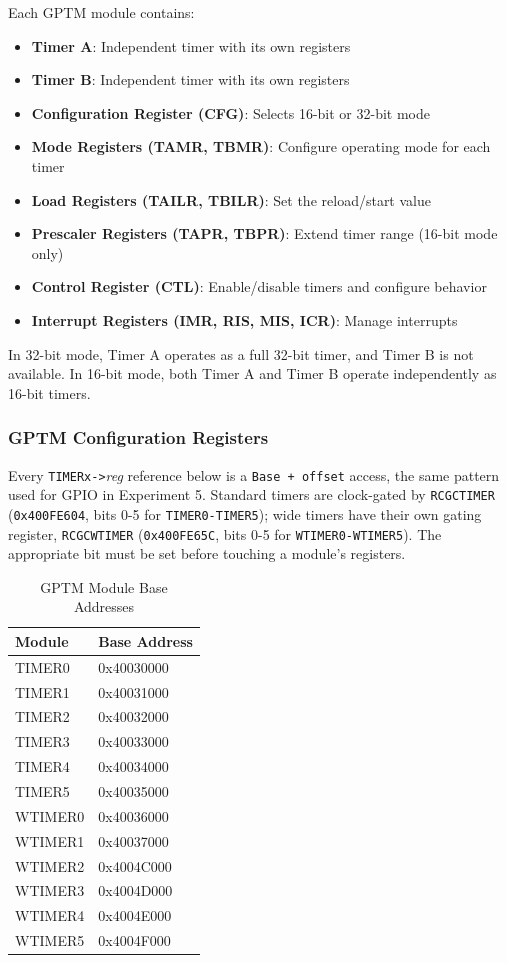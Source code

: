 Each GPTM module contains:
\begin{itemize}[nosep]
  \item \textbf{Timer A}: Independent timer with its own registers
  \item \textbf{Timer B}: Independent timer with its own registers
  \item \textbf{Configuration Register (CFG)}: Selects 16-bit or 32-bit mode
  \item \textbf{Mode Registers (TAMR, TBMR)}: Configure operating mode for each timer
  \item \textbf{Load Registers (TAILR, TBILR)}: Set the reload/start value
  \item \textbf{Prescaler Registers (TAPR, TBPR)}: Extend timer range (16-bit mode only)
  \item \textbf{Control Register (CTL)}: Enable/disable timers and configure behavior
  \item \textbf{Interrupt Registers (IMR, RIS, MIS, ICR)}: Manage interrupts
\end{itemize}

\noindent
In 32-bit mode, Timer A operates as a full 32-bit timer, and Timer B is not available. In 16-bit mode, both Timer A and Timer B operate independently as 16-bit timers.

\subsubsection{GPTM Configuration Registers}

Every \texttt{TIMERx->}\emph{reg} reference below is a \texttt{Base + offset} access, the same pattern used for GPIO in Experiment 5. Standard timers are clock-gated by \texttt{RCGCTIMER} (\texttt{0x400FE604}, bits 0-5 for \texttt{TIMER0-TIMER5}); wide timers have their own gating register, \texttt{RCGCWTIMER} (\texttt{0x400FE65C}, bits 0-5 for \texttt{WTIMER0-WTIMER5}). The appropriate bit must be set before touching a module's registers.

\begin{table}[H]
\centering
\small
\begin{tabular}{ll}
\toprule
\textbf{Module} & \textbf{Base Address} \\
\midrule
TIMER0 & 0x40030000 \\
TIMER1 & 0x40031000 \\
TIMER2 & 0x40032000 \\
TIMER3 & 0x40033000 \\
TIMER4 & 0x40034000 \\
TIMER5 & 0x40035000 \\
WTIMER0 & 0x40036000 \\
WTIMER1 & 0x40037000 \\
WTIMER2 & 0x4004C000 \\
WTIMER3 & 0x4004D000 \\
WTIMER4 & 0x4004E000 \\
WTIMER5 & 0x4004F000 \\
\bottomrule
\end{tabular}
\caption{GPTM Module Base Addresses}
\end{table}

